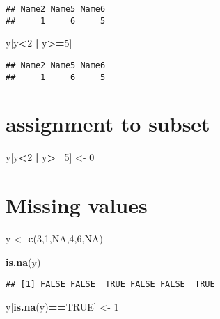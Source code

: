 \documentclass[]{article}
\newenvironment{Shaded}{\begin{snugshade}}{\end{snugshade}}
\newcommand{\KeywordTok}[1]{\textcolor[rgb]{0.13,0.29,0.53}{\textbf{#1}}}
\newcommand{\DecValTok}[1]{\textcolor[rgb]{0.00,0.00,0.81}{#1}}
\newcommand{\StringTok}[1]{\textcolor[rgb]{0.31,0.60,0.02}{#1}}
\newcommand{\OtherTok}[1]{\textcolor[rgb]{0.56,0.35,0.01}{#1}}
\newcommand{\OperatorTok}[1]{\textcolor[rgb]{0.81,0.36,0.00}{\textbf{#1}}}
\newcommand{\NormalTok}[1]{#1}
\begin{document}
\begin{verbatim}
## Name2 Name5 Name6 
##     1     6     5
\end{verbatim}

\begin{Shaded}
\begin{Highlighting}[]
\NormalTok{y[y}\OperatorTok{<}\DecValTok{2} \OperatorTok{|}\StringTok{ }\NormalTok{y}\OperatorTok{>=}\DecValTok{5}\NormalTok{]}
\end{Highlighting}
\end{Shaded}

\begin{verbatim}
## Name2 Name5 Name6 
##     1     6     5
\end{verbatim}

\section{assignment to subset}\label{assignment-to-subset}

\begin{Shaded}
\begin{Highlighting}[]
\NormalTok{y[y}\OperatorTok{<}\DecValTok{2} \OperatorTok{|}\StringTok{ }\NormalTok{y}\OperatorTok{>=}\DecValTok{5}\NormalTok{] <-}\StringTok{ }\DecValTok{0}
\end{Highlighting}
\end{Shaded}

\section{Missing values}\label{missing-values}

\begin{Shaded}
\begin{Highlighting}[]
\NormalTok{y <-}\StringTok{ }\KeywordTok{c}\NormalTok{(}\DecValTok{3}\NormalTok{,}\DecValTok{1}\NormalTok{,}\OtherTok{NA}\NormalTok{,}\DecValTok{4}\NormalTok{,}\DecValTok{6}\NormalTok{,}\OtherTok{NA}\NormalTok{)}

\KeywordTok{is.na}\NormalTok{(y)}
\end{Highlighting}
\end{Shaded}

\begin{verbatim}
## [1] FALSE FALSE  TRUE FALSE FALSE  TRUE
\end{verbatim}

\begin{Shaded}
\begin{Highlighting}[]
\NormalTok{y[}\KeywordTok{is.na}\NormalTok{(y)}\OperatorTok{==}\OtherTok{TRUE}\NormalTok{] <-}\StringTok{ }\DecValTok{1}
\end{Highlighting}
\end{Shaded}
\end{document}
